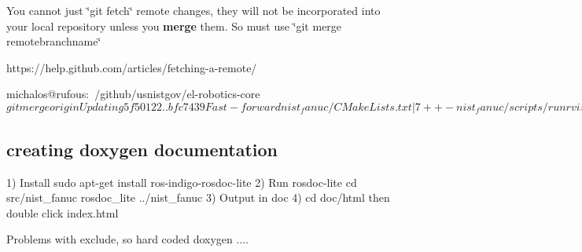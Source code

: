 You cannot just \char`\"{}git fetch\char`\"{} remote changes, they will not be incorporated into your local repository unless you {\bfseries merge} them. So must use \char`\"{}git merge remotebranchname\char`\"{} \begin{DoxyVerb}https://help.github.com/articles/fetching-a-remote/

michalos@rufous:~/github/usnistgov/el-robotics-core$ git merge origin
Updating 5f50122..bfc7439
Fast-forward
 nist_fanuc/CMakeLists.txt           |   7 ++-
 nist_fanuc/scripts/runrvizdemo.bash |   2 +-
 nist_kitting/src/move_group.cpp     |  59 +------------------
 nist_kitting/src/mover.cpp          | 111 ++++--------------------------------
 ulapi/package.xml                   |   2 +-
 5 files changed, 20 insertions(+), 161 deletions(-)
michalos@rufous:~/github/usnistgov/el-robotics-core$ 
\end{DoxyVerb}


\subsection*{creating doxygen documentation }

1) Install sudo apt-\/get install ros-\/indigo-\/rosdoc-\/lite 2) Run rosdoc-\/lite cd src/nist\-\_\-fanuc rosdoc\-\_\-lite ../nist\-\_\-fanuc 3) Output in doc 4) cd doc/html then double click index.\-html

Problems with exclude, so hard coded doxygen .... 